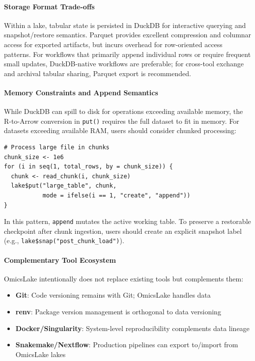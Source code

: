 \documentclass[11pt,a4paper]{article}
\begin{document}
\paragraph{Storage Format Trade-offs}
Within a lake, tabular state is persisted in DuckDB for interactive querying and snapshot/restore semantics. Parquet provides excellent compression and columnar access for exported artifacts, but incurs overhead for row-oriented access patterns. For workflows that primarily append individual rows or require frequent small updates, DuckDB-native workflows are preferable; for cross-tool exchange and archival tabular sharing, Parquet export is recommended.

\paragraph{Memory Constraints and Append Semantics}
While DuckDB can spill to disk for operations exceeding available memory, the R-to-Arrow conversion in \texttt{put()} requires the full dataset to fit in memory. For datasets exceeding available RAM, users should consider chunked processing:

\begin{lstlisting}[caption={Chunked processing for large datasets}]
# Process large file in chunks
chunk_size <- 1e6
for (i in seq(1, total_rows, by = chunk_size)) {
  chunk <- read_chunk(i, chunk_size)
  lake$put("large_table", chunk,
           mode = ifelse(i == 1, "create", "append"))
}
\end{lstlisting}

In this pattern, \texttt{append} mutates the active working table. To preserve a restorable checkpoint after chunk ingestion, users should create an explicit snapshot label (e.g., \texttt{lake\$snap("post\_chunk\_load")}).

\paragraph{Complementary Tool Ecosystem}
OmicsLake intentionally does not replace existing tools but complements them:
\begin{itemize}
    \item \textbf{Git}: Code versioning remains with Git; OmicsLake handles data
    \item \textbf{renv}: Package version management is orthogonal to data versioning
    \item \textbf{Docker/Singularity}: System-level reproducibility complements data lineage
    \item \textbf{Snakemake/Nextflow}: Production pipelines can export to/import from OmicsLake lakes
\end{itemize}
\end{document}
